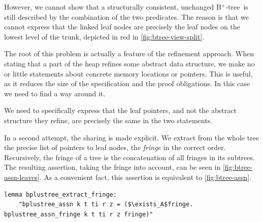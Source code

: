 \documentclass[runningheads]{llncs}
\newcommand{\btree}{B$^+$-tree}
\begin{document}
However, we cannot show that a structurally consistent, unchanged \btree\
is still described by the combination of the two predicates.
The reason is that we cannot express that the linked leaf nodes
are precisely the leaf nodes on the lowest level of the trunk, depicted
in red in \cref{fig:btree-view-split}.

The root of this problem is actually a feature of the refinement approach.
When stating that a part of the heap
refines some abstract data structure,
we make no or little statements about concrete memory locations or pointers.
This is useful, as it reduces the size of the specification
and the proof obligations.
In this case we need to find a way around it.


We need to specifically express that the leaf pointers,
and not the abstract structure they refine,
are precisely the same in the two statements.

In a second attempt, the sharing is made explicit.
We extract from the whole tree the precise list of pointers to leaf nodes, the \emph{fringe}
in the correct order.
Recursively, the fringe of a tree is the concatenation of all fringes
in its subtrees.
The resulting assertion, taking the fringe into account, can be seen in \cref{fig:btree-assn-leaves}.
As a convenient fact, this assertion is equivalent to \cref{fig:btree-assn}.

\begin{lstlisting}[mathescape=true, language=Isabelle,label=lst:btree-extract-fringe]
lemma bplustree_extract_fringe:
    "bplustree_assn k t ti r z = ($\exists_A$fringe. bplustree_assn_fringe k t ti r z fringe)"
\end{lstlisting}
\end{document}
